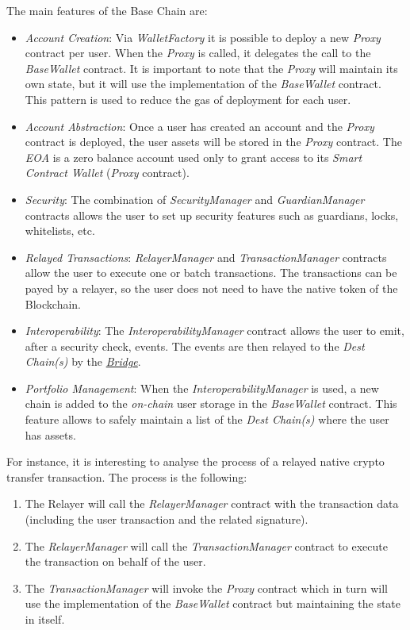 The main features of the Base Chain are:
\begin{itemize}
    \item \textit{Account Creation}: Via \textit{WalletFactory} it is possible to deploy a new \textit{Proxy} contract per user. When the \textit{Proxy} is called, it delegates the call to the \textit{BaseWallet} contract. It is important to note that the \textit{Proxy} will maintain its own state, but it will use the implementation of the \textit{BaseWallet} contract. This pattern is used to reduce the gas of deployment for each user.
    \item \textit{Account Abstraction}: Once a user has created an account and the \textit{Proxy} contract is deployed, the user assets will be stored in the \textit{Proxy} contract. The \textit{EOA} is a zero balance account used only to grant access to its \textit{Smart Contract Wallet} (\textit{Proxy} contract).
    \item \textit{Security}: The combination of \textit{SecurityManager} and \textit{GuardianManager} contracts allows the user to set up security features such as guardians, locks, whitelists, etc.
    \item \textit{Relayed Transactions}: \textit{RelayerManager} and \textit{TransactionManager} contracts allow the user to execute one or batch transactions. The transactions can be payed by a relayer, so the user does not need to have the native token of the Blockchain. 
    \item \textit{Interoperability}: The \textit{InteroperabilityManager} contract allows the user to emit, after a security check, events. The events are then relayed to the \textit{Dest Chain(s)} by the \hyperref[sec:bridge]{\textit{Bridge}}.
    \item \textit{Portfolio Management}: When the \textit{InteroperabilityManager} is used, a new chain is added to the \textit{on-chain} user storage in the \textit{BaseWallet} contract. This feature allows to safely maintain a list of the \textit{Dest Chain(s)} where the user has assets.
\end{itemize}

For instance, it is interesting to analyse the process of a relayed native crypto transfer transaction. The process is the following:
\begin{enumerate}
    \item The Relayer will call the \textit{RelayerManager} contract with the transaction data (including the user transaction and the related signature).
    \item The \textit{RelayerManager} will call the \textit{TransactionManager} contract to execute the transaction on behalf of the user.
    \item The \textit{TransactionManager} will invoke the \textit{Proxy} contract which in turn will use the implementation of the \textit{BaseWallet} contract but maintaining the state in itself.
\end{enumerate}

